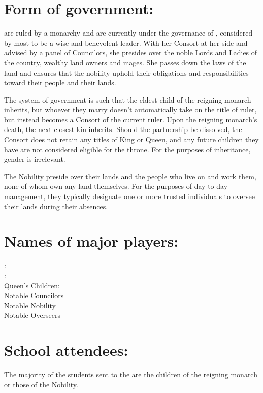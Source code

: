 \documentclass[blue]{GL2020}
\begin{document}
\name{\bAgrarians{}}

\section*{Form of government:}

\pSun{} are ruled by a monarchy and are currently under the governance of \cQueen{}, considered by most to be a wise and benevolent leader.  With her Consort at her side and advised by a panel of Councilors, she presides over the noble Lords and Ladies of the country, wealthy land owners and mages.  She passes down the laws of the land and ensures that the nobility uphold their obligations and responsibilities toward their people and their lands.

The system of government is such that the eldest child of the reigning monarch inherits, but whoever they marry doesn't automatically take on the title of ruler, but instead becomes a Consort of the current ruler.  Upon the reigning monarch's death, the next closest kin inherits.  Should the partnership be dissolved, the Consort does not retain any titles of King or Queen, and any future children they have are not considered eligible for the throne.  For the purposes of inheritance, gender is irrelevant.

The Nobility preside over their lands and the people who live on and work them, none of whom own any land themselves.  For the purposes of day to day management, they typically designate one or more trusted individuals to oversee their lands during their absences.

\section*{Names of major players:}

\cQueen{}:\\
\cConsort{}:\\
Queen's Children:\\
Notable Councilors\\
Notable Nobility\\
Notable Overseers\\

\section*{School attendees:}

The majority of the students sent to the \pSchool{} are the children of the reigning monarch or those of the Nobility.
\end{document}
